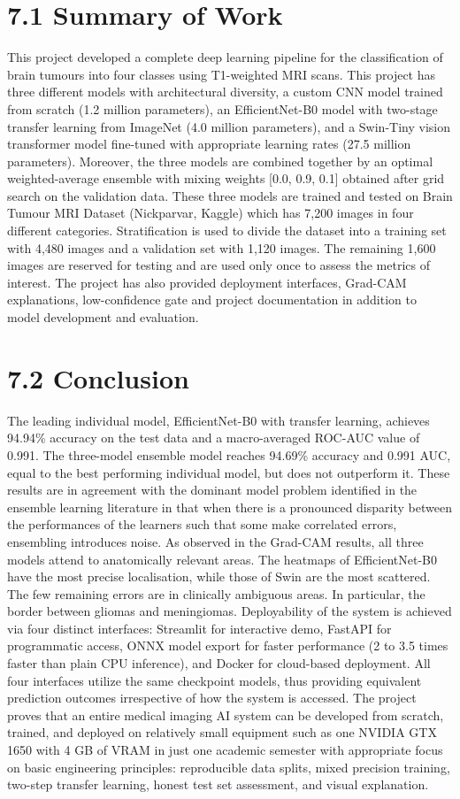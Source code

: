 \documentclass[12pt,a4paper,oneside]{report}
\begin{document}
\section*{7.1 Summary of Work}
This project developed a complete deep learning pipeline for the classification of brain tumours into four classes using T1-weighted MRI scans. This project has three different models with architectural diversity, a custom CNN model trained from scratch (1.2 million parameters), an EfficientNet-B0 model with two-stage transfer learning from ImageNet (4.0 million parameters), and a Swin-Tiny vision transformer model fine-tuned with appropriate learning rates (27.5 million parameters). Moreover, the three models are combined together by an optimal weighted-average ensemble with mixing weights [0.0, 0.9, 0.1] obtained after grid search on the validation data.
These three models are trained and tested on Brain Tumour MRI Dataset (Nickparvar, Kaggle) which has 7,200 images in four different categories. Stratification is used to divide the dataset into a training set with 4,480 images and a validation set with 1,120 images. The remaining 1,600 images are reserved for testing and are used only once to assess the metrics of interest.
The project has also provided deployment interfaces, Grad-CAM explanations, low-confidence gate and project documentation in addition to model development and evaluation.
\section*{7.2 Conclusion}
The leading individual model, EfficientNet-B0 with transfer learning, achieves 94.94\% accuracy on the test data and a macro-averaged ROC-AUC value of 0.991. The three-model ensemble model reaches 94.69\% accuracy and 0.991 AUC, equal to the best performing individual model, but does not outperform it. These results are in agreement with the dominant model problem identified in the ensemble learning literature in that when there is a pronounced disparity between the performances of the learners such that some make correlated errors, ensembling introduces noise.
As observed in the Grad-CAM results, all three models attend to anatomically relevant areas. The heatmaps of EfficientNet-B0 have the most precise localisation, while those of Swin are the most scattered. The few remaining errors are in clinically ambiguous areas. In particular, the border between gliomas and meningiomas.
Deployability of the system is achieved via four distinct interfaces: Streamlit for interactive demo, FastAPI for programmatic access, ONNX model export for faster performance (2 to 3.5 times faster than plain CPU inference), and Docker for cloud-based deployment. All four interfaces utilize the same checkpoint models, thus providing equivalent prediction outcomes irrespective of how the system is accessed.
The project proves that an entire medical imaging AI system can be developed from scratch, trained, and deployed on relatively small equipment such as one NVIDIA GTX 1650 with 4 GB of VRAM in just one academic semester with appropriate focus on basic engineering principles: reproducible data splits, mixed precision training, two-step transfer learning, honest test set assessment, and visual explanation.
\end{document}
